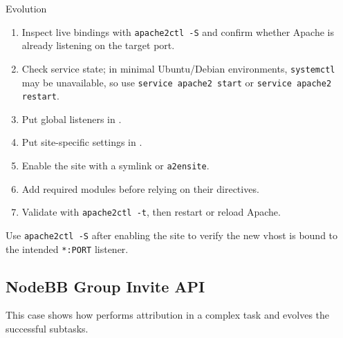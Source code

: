 \begin{svpromptbox}{Evolution}
\svpartsep
{}
\begin{enumerate}
    \item Inspect live bindings with \texttt{apache2ctl -S} and confirm whether Apache is already listening on the target port.
    \item Check service state; in minimal Ubuntu/Debian environments, \texttt{systemctl} may be unavailable, so use \texttt{service apache2 start} or \texttt{service apache2 restart}.
    \item Put global listeners in .
    \item Put site-specific settings in .
    \item Enable the site with a symlink or \texttt{a2ensite}.
    \item Add required modules before relying on their directives.
    \item Validate with \texttt{apache2ctl -t}, then restart or reload Apache.
\end{enumerate}
Use \texttt{apache2ctl -S} after enabling the site to verify the new vhost is bound to the intended \texttt{*:PORT} listener.

\end{svpromptbox}

\subsection{NodeBB Group Invite API}

\noindent This case shows how \ours performs attribution in a complex task and evolves the successful subtasks.\par\medskip

